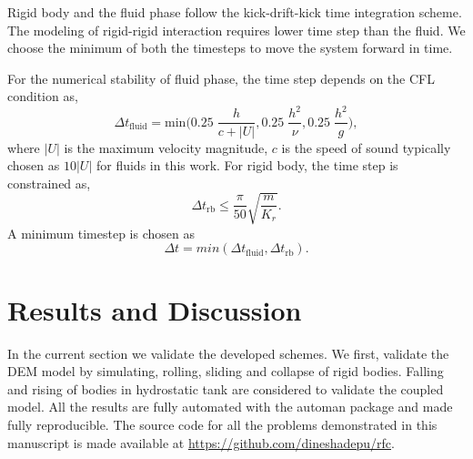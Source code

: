Rigid body and the fluid phase follow the kick-drift-kick time integration
scheme. The modeling of rigid-rigid interaction requires lower time step than the fluid. We choose the minimum of both the timesteps to move the system forward
in time.

For the numerical stability of fluid phase, the time step depends on the CFL condition as,
\begin{equation}
  \label{eq:rfc:time-step-cfl}
  \Delta t_{\text{fluid}} = \mathrm{min} \bigg( 0.25 \; \frac{h}{c + |U|} ,  0.25 \; \frac{h^2}{\nu},  0.25 \; \frac{h^2}{g} \bigg),
\end{equation}
where $|U|$ is the maximum velocity magnitude, $c$ is the speed of sound
typically chosen as $10 |U|$ for fluids in this work. For rigid body, the time
step is constrained as,
\begin{equation}
  \label{eq:rfc:time-step-body-force}
  \Delta t_{\text{rb}} \leq \frac{\pi}{50} \sqrt{\frac{m}{K_r}}.
\end{equation}
A minimum timestep is chosen as
\begin{equation}
  \label{eq:rfc:time-step-body-force}
  \Delta t = min(\Delta t_{\text{fluid}}, \Delta t_{\text{rb}}).
\end{equation}



\FloatBarrier%
\section{Results and Discussion}
\label{sec:rfc:results}
In the current section we validate the developed schemes. We first, validate the
DEM model by simulating, rolling, sliding and collapse of rigid bodies. Falling
and rising of bodies in hydrostatic tank are considered to validate the coupled
model. All the results are fully automated with the automan package
\citep{automan2018} and made fully reproducible. The source code for all the
problems demonstrated in this manuscript is made available at
\url{https://github.com/dineshadepu/rfc}.


\FloatBarrier%
